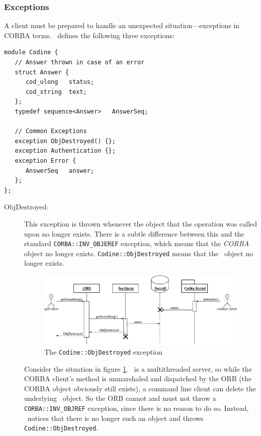 \subsubsection{\label{s_user_exceptions}Exceptions}
A client must be prepared to
handle an unexpected situation---exceptions in CORBA terms. \qidl\ defines
the following three exceptions:
\begin{Verbatim}[fontsize=\small, frame=single]
module Codine {
   // Answer thrown in case of an error
   struct Answer {
      cod_ulong   status;
      cod_string  text;
   };
   typedef sequence<Answer>   AnswerSeq;

   // Common Exceptions
   exception ObjDestroyed() {};
   exception Authentication {};
   exception Error {
      AnswerSeq   answer;
   };
};
\end{Verbatim}
\begin{description}
\item[ObjDestroyed:] This exception is thrown whenever the object that the
operation was called upon no longer exists. There is a subtle difference
between this and the standard \texttt{CORBA::INV\_OBJEREF} exception, which
means that the \emph{CORBA} object no longer exists.
\texttt{Codine::ObjDestroyed} means that the \emph{\codine}\ object no longer
exists.

\begin{figure}
\includegraphics[width=\textwidth]{objdestroyed.eps}
\caption{\label{f_ObjDestroyed}The \texttt{Codine::ObjDestroyed} exception}
\end{figure}

Consider the situation in figure \ref{f_ObjDestroyed}. \qidl\
is a multithreaded server, so while the CORBA client's method is unmarshaled
and dispatched by the ORB (the CORBA object obviously still exists), a
command line client can delete the underlying \codine\ object. So the ORB
cannot and must not throw a \texttt{CORBA::INV\_OBJREF} exception, since
there is no reason to do so. Instead, \qidl\ notices that there is no longer
such an object and throws \texttt{Codine::ObjDestroyed}.


\end{description}

